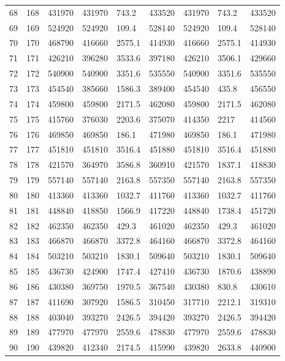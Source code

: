 \begin{tabular}{lllllllll}
68 & 168 & 431970 & 431970 & 743.2 & 433520 & 431970 & 743.2 & 433520 \\ 
69 & 169 & 524920 & 524920 & 109.4 & 528140 & 524920 & 109.4 & 528140 \\ 
70 & 170 & 468790 & 416660 & 2575.1 & 414930 & 416660 & 2575.1 & 414930 \\ 
71 & 171 & 426210 & 396280 & 3533.6 & 397180 & 426210 & 3506.1 & 429660 \\ 
72 & 172 & 540900 & 540900 & 3351.6 & 535550 & 540900 & 3351.6 & 535550 \\ 
73 & 173 & 454540 & 385660 & 1586.3 & 389400 & 454540 & 435.8 & 456550 \\ 
74 & 174 & 459800 & 459800 & 2171.5 & 462080 & 459800 & 2171.5 & 462080 \\ 
75 & 175 & 415760 & 376030 & 2203.6 & 375070 & 414350 & 2217 & 414560 \\ 
76 & 176 & 469850 & 469850 & 186.1 & 471980 & 469850 & 186.1 & 471980 \\ 
77 & 177 & 451810 & 451810 & 3516.4 & 451880 & 451810 & 3516.4 & 451880 \\ 
78 & 178 & 421570 & 364970 & 3586.8 & 360910 & 421570 & 1837.1 & 418830 \\ 
79 & 179 & 557140 & 557140 & 2163.8 & 557350 & 557140 & 2163.8 & 557350 \\ 
80 & 180 & 413360 & 413360 & 1032.7 & 411760 & 413360 & 1032.7 & 411760 \\ 
81 & 181 & 448840 & 418850 & 1566.9 & 417220 & 448840 & 1738.4 & 451720 \\ 
82 & 182 & 462350 & 462350 & 429.3 & 461020 & 462350 & 429.3 & 461020 \\ 
83 & 183 & 466870 & 466870 & 3372.8 & 464160 & 466870 & 3372.8 & 464160 \\ 
84 & 184 & 503210 & 503210 & 1830.1 & 509640 & 503210 & 1830.1 & 509640 \\ 
85 & 185 & 436730 & 424900 & 1747.4 & 427410 & 436730 & 1870.6 & 438890 \\ 
86 & 186 & 430380 & 369750 & 1970.5 & 367540 & 430380 & 830.8 & 430610 \\ 
87 & 187 & 411690 & 307920 & 1586.5 & 310450 & 317710 & 2212.1 & 319310 \\ 
88 & 188 & 403040 & 393270 & 2426.5 & 394420 & 393270 & 2426.5 & 394420 \\ 
89 & 189 & 477970 & 477970 & 2559.6 & 478830 & 477970 & 2559.6 & 478830 \\ 
90 & 190 & 439820 & 412340 & 2174.5 & 415990 & 439820 & 2633.8 & 440900 \\ 

\end{tabular}
